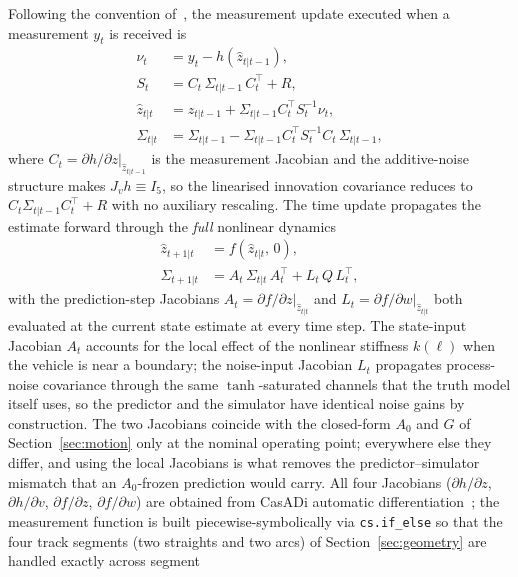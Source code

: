 \documentclass[11pt,a4paper]{article}
\newcommand{\code}[1]{\texttt{#1}}
\begin{document}
Following the convention of~\cite{Sopasakis_5_ekf}, the measurement
update executed when a measurement $y_t$ is received is
\begin{align}
\nu_t          &= y_t - h(\hat{z}_{t|t-1}), \label{eq:innov}\\
S_t            &= C_t\,\Sigma_{t|t-1}\,C_t^{\!\top} + R,
                  \label{eq:cov}\\
\hat{z}_{t|t}  &= \hat{z}_{t|t-1} + \Sigma_{t|t-1} C_t^{\!\top} S_t^{-1}
                  \nu_t, \label{eq:meas}\\
\Sigma_{t|t}   &= \Sigma_{t|t-1} - \Sigma_{t|t-1} C_t^{\!\top} S_t^{-1}
                  C_t\,\Sigma_{t|t-1}, \label{eq:sigm}
\end{align}
where $C_t=\partial h/\partial z|_{\hat{z}_{t|t-1}}$ is the
measurement Jacobian and
the additive-noise structure makes $J_v h\equiv I_5$, so the linearised innovation covariance reduces to $C_t\Sigma_{t|t-1}C_t^{\!\top}+R$ with no auxiliary rescaling. The time update
propagates the estimate forward through the \emph{full} nonlinear
dynamics
\begin{align}
\hat{z}_{t+1|t}  &= f(\hat{z}_{t|t},\,0), \label{eq:tpred}\\
\Sigma_{t+1|t}   &= A_t\,\Sigma_{t|t}\,A_t^{\!\top}
                    + L_t\,Q\,L_t^{\!\top}, \label{eq:tsigm}
\end{align}
with the prediction-step Jacobians
$A_t=\partial f/\partial z|_{\hat{z}_{t|t}}$ and
$L_t=\partial f/\partial w|_{\hat{z}_{t|t}}$ both evaluated at the
current state estimate at every time step.
The state-input Jacobian $A_t$ accounts for the local effect of the
nonlinear stiffness $k(\ell)$ when the vehicle is near a boundary; the
noise-input Jacobian $L_t$ propagates process-noise covariance through
the same $\tanh$-saturated channels that the truth model itself uses,
so the predictor and the simulator have identical noise gains by
construction. The two Jacobians coincide with the closed-form
$A_0$ and $G$ of Section~\ref{sec:motion} only at the nominal operating
point; everywhere else they differ, and using the local Jacobians is
what removes the predictor--simulator mismatch that an
$A_0$-frozen prediction would carry. All four Jacobians
($\partial h/\partial z$, $\partial h/\partial v$, $\partial f/\partial
z$, $\partial f/\partial w$) are obtained from CasADi
automatic differentiation~\cite{Andersson2019}; the measurement
function is built piecewise-symbolically via \code{cs.if\_else} so
that the four track segments (two straights and two arcs) of
Section~\ref{sec:geometry} are handled exactly across segment
\end{document}
